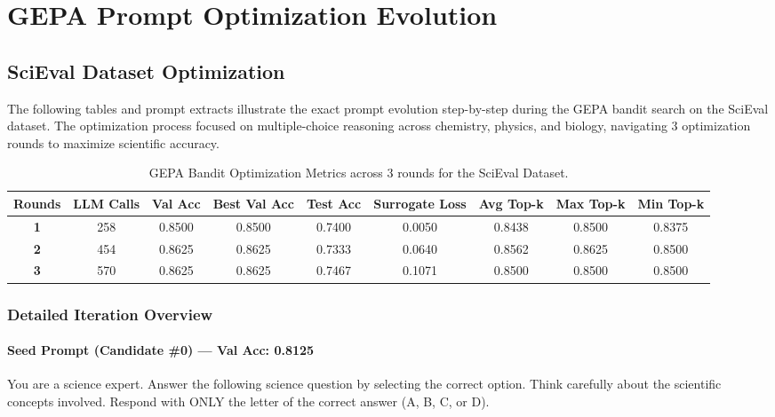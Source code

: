 \documentclass{report}
\begin{document}
\chapter{GEPA Prompt Optimization Evolution}

\section{SciEval Dataset Optimization}

The following tables and prompt extracts illustrate the exact prompt evolution step-by-step during the GEPA bandit search on the SciEval dataset. The optimization process focused on multiple-choice reasoning across chemistry, physics, and biology, navigating 3 optimization rounds to maximize scientific accuracy.

\begin{table}[htbp]
    \centering
    \begin{tabular}{ccccccccc}
    \toprule
    \textbf{Rounds} & \textbf{LLM Calls} & \textbf{Val Acc} & \textbf{Best Val Acc} & \textbf{Test Acc} & \textbf{Surrogate Loss} & \textbf{Avg Top-k} & \textbf{Max Top-k} & \textbf{Min Top-k} \\
    \midrule
    \textbf{1} & 258 & 0.8500 & 0.8500 & 0.7400 & 0.0050 & 0.8438 & 0.8500 & 0.8375 \\
    \textbf{2} & 454 & 0.8625 & 0.8625 & 0.7333 & 0.0640 & 0.8562 & 0.8625 & 0.8500 \\
    \textbf{3} & 570 & 0.8625 & 0.8625 & 0.7467 & 0.1071 & 0.8500 & 0.8500 & 0.8500 \\
    \bottomrule
    \end{tabular}
    \caption{GEPA Bandit Optimization Metrics across 3 rounds for the SciEval Dataset.}
    \label{tab:scieval_metrics}
\end{table}

\subsection*{Detailed Iteration Overview}

\subsubsection*{Seed Prompt (Candidate \#0) --- Val Acc: 0.8125}
\begin{mdframed}[style=promptbox]
You are a science expert. Answer the following science question by selecting the correct option. Think carefully about the scientific concepts involved. Respond with ONLY the letter of the correct answer (A, B, C, or D).
\end{mdframed}
\end{document}
